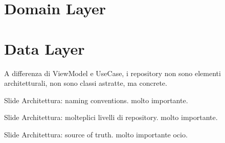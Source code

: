 \section{Domain Layer}


\section{Data Layer}
\par A differenza di ViewModel e UseCase, i repository non sono elementi architetturali, non sono classi astratte, ma concrete.

\par Slide Architettura: naming conventions. molto importante.
\par Slide Architettura: molteplici livelli di repository. molto importante.
\par Slide Architettura: source of truth. molto importante ocio.


